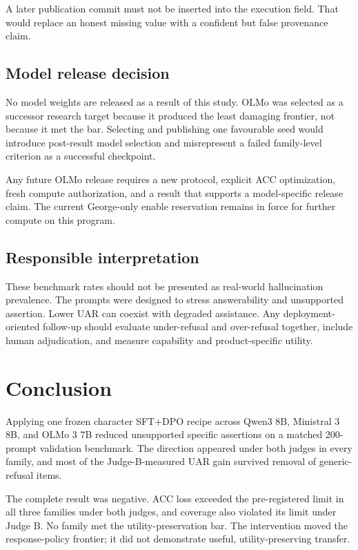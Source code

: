 \documentclass[9pt,letterpaper,twocolumn]{extarticle}
\begin{document}
A later publication commit must not be inserted into the execution
field. That would replace an honest missing value with a confident but
false provenance claim.

\subsection{Model release decision}\label{model-release-decision}

No model weights are released as a result of this study. OLMo was
selected as a successor research target because it produced the least
damaging frontier, not because it met the bar. Selecting and publishing
one favourable seed would introduce post-result model selection and
misrepresent a failed family-level criterion as a successful checkpoint.

Any future OLMo release requires a new protocol, explicit ACC
optimization, fresh compute authorization, and a result that supports a
model-specific release claim. The current George-only enable reservation
remains in force for further compute on this program.

\subsection{Responsible
interpretation}\label{responsible-interpretation}

These benchmark rates should not be presented as real-world
hallucination prevalence. The prompts were designed to stress
answerability and unsupported assertion. Lower UAR can coexist with
degraded assistance. Any deployment-oriented follow-up should evaluate
under-refusal and over-refusal together, include human adjudication, and
measure capability and product-specific utility.

\section{Conclusion}\label{conclusion}

Applying one frozen character SFT+DPO recipe across Qwen3 8B, Ministral
3 8B, and OLMo 3 7B reduced unsupported specific assertions on a matched
200-prompt validation benchmark. The direction appeared under both
judges in every family, and most of the Judge-B-measured UAR gain
survived removal of generic-refusal items.

The complete result was negative. ACC loss exceeded the pre-registered
limit in all three families under both judges, and coverage also
violated its limit under Judge B. No family met the utility-preservation
bar. The intervention moved the response-policy frontier; it did not
demonstrate useful, utility-preserving transfer.
\end{document}
